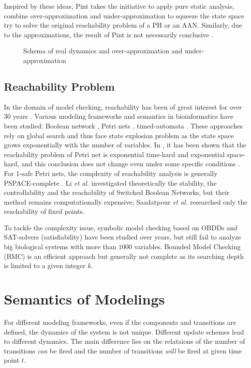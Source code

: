 Inspired by these ideas, Pint \cite{Pint} takes the initiative to apply pure static analysis, combine over-approximation and under-approximation to squeeze the state space try to solve the original reachability problem of a PH or an AAN.
Similarly, due to the approximations, the result of Pint is not necessarily conclusive \cite{folschette2015}.

\begin{figure}
    \centering
    
    \caption[Static analysis]{Schema of real dynamics and over-approximation and under-approximation}
    \label{fig:vennDiagram}
\end{figure}

\subsection{Reachability Problem}
In the domain of model checking, reachability has been of great interest for over 30 years \cite{clarke2008birth,clarke20142}. 
Various modeling frameworks and semantics in bioinformatics have been studied: Boolean network \cite{akutsu2007control}, Petri nets \cite{mayr1984,esparza1998}, timed-automata \cite{Daws1998,wozna2003}. 
These approaches rely on global search and thus face state explosion problem as the state space grows exponentially with the number of variables. 
In \cite{peterson1977petri}, it has been shown that the reachability problem of Petri net is exponential time-hard and exponential space-hard, and this conclusion does not change even under some specific conditions \cite{esparza1998}. 
For 1-safe Petri nets, the complexity of reachability analysis is generally PSPACE-complete \cite{cheng1995complexity}.
Li \textit{et al.} \cite{li2012reachability,li2014stability} investigated theoretically the stability, the controllability and the reachability of Switched Boolean Networks, but their method remains computationally expensive;
Saadatpour \textit{et al.} \cite{saadatpour2010attractor} researched only the reachability of fixed points.

To tackle the complexity issue, symbolic model checking \cite{burch1992symbolic} based on OBDDs and SAT-solvers (satisfiability) \cite{abdulla2000symbolic} have been studied over years, but still fail to analyze big biological systems with more than $1000$ variables. 
Bounded Model Checking (BMC) \cite{clarke2001bounded} is an efficient approach but generally not complete as its searching depth is limited to a given integer $k$.
\section{Semantics of Modelings}
For different modeling frameworks, even if the components and transitions are defined, the dynamics of the system is not unique. 
Different update schemes lead to different dynamics.
The main difference lies on the relataions of the number of transitions \textit{can} be fired and the number of transitions \textit{will} be fired at given time point $t$.


